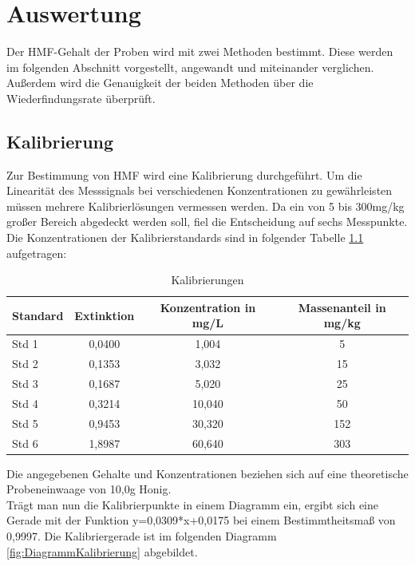 \chapter{Auswertung}
Der HMF-Gehalt der Proben wird mit zwei Methoden bestimmt. Diese werden im folgenden Abschnitt vorgestellt, angewandt und miteinander verglichen. Außerdem wird die Genauigkeit der beiden Methoden über die Wiederfindungsrate überprüft.
\section{Kalibrierung}
Zur Bestimmung von HMF wird eine Kalibrierung durchgeführt. Um die Linearität des Messsignals bei verschiedenen Konzentrationen zu gewährleisten müssen mehrere Kalibrierlösungen vermessen werden. Da ein von 5 bis 300mg/kg großer Bereich abgedeckt werden soll, fiel die Entscheidung auf sechs Messpunkte. Die Konzentrationen der Kalibrierstandards sind in folgender Tabelle \ref{tab:Kalibrierungen} aufgetragen:

\begin{table}[htbp]
	\centering
	\caption{Kalibrierungen}
		\begin{tabular}{l|c|c|c}
			Standard & Extinktion & Konzentration in mg/L &  Massenanteil in mg/kg\\
			\hline
			Std 1 & 0,0400 & 1,004 & 5\\
			\hline
			Std 2 & 0,1353 & 3,032 & 15\\
			\hline
			Std 3 & 0,1687 & 5,020 & 25\\
			\hline
			Std 4 & 0,3214 & 10,040 & 50\\
			\hline
			Std 5 & 0,9453 & 30,320 & 152\\
			\hline
			Std 6 & 1,8987 & 60,640 & 303
		\end{tabular}
		\label{tab:Kalibrierungen}
\end{table}

Die angegebenen Gehalte und Konzentrationen beziehen sich auf eine theoretische Probeneinwaage von 10,0g Honig.\\
Trägt man nun die Kalibrierpunkte in einem Diagramm ein, ergibt sich eine Gerade mit der Funktion y=0,0309*x+0,0175 bei einem Bestimmtheitsmaß von 0,9997. Die Kalibriergerade ist im folgenden Diagramm \ref{fig:DiagrammKalibrierung} abgebildet.

